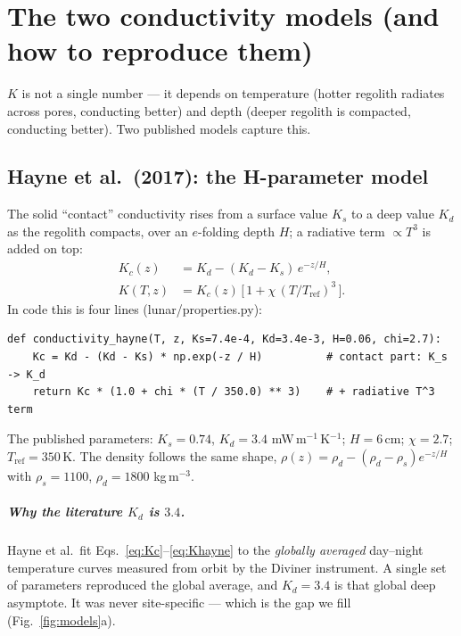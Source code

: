 \documentclass[11pt]{report}
\newcommand{\code}[1]{{\ttfamily\small #1}}
\begin{document}
\chapter{The two conductivity models (and how to reproduce them)}\label{ch:models}
$K$ is not a single number --- it depends on temperature (hotter regolith
radiates across pores, conducting better) and depth (deeper regolith is
compacted, conducting better). Two published models capture this.

\section{Hayne et al.\ (2017): the H-parameter model}\label{sec:hayne}
The solid ``contact'' conductivity rises from a surface value $K_s$ to a deep
value $K_d$ as the regolith compacts, over an $e$-folding depth $H$; a radiative
term $\propto T^3$ is added on top:
\begin{align}
K_c(z) &= K_d - (K_d-K_s)\,e^{-z/H}, \label{eq:Kc}\\
K(T,z) &= K_c(z)\,\bigl[\,1+\chi\,(T/T_{\mathrm{ref}})^3\,\bigr].\label{eq:Khayne}
\end{align}
In code this is four lines (\code{lunar/properties.py}):
\begin{lstlisting}[style=py]
def conductivity_hayne(T, z, Ks=7.4e-4, Kd=3.4e-3, H=0.06, chi=2.7):
    Kc = Kd - (Kd - Ks) * np.exp(-z / H)          # contact part: K_s -> K_d
    return Kc * (1.0 + chi * (T / 350.0) ** 3)    # + radiative T^3 term
\end{lstlisting}
The published parameters: $K_s=0.74$, $K_d=3.4$ mW\,m$^{-1}$\,K$^{-1}$;
$H=6$\,cm; $\chi=2.7$; $T_{\mathrm{ref}}=350$\,K. The density follows the same
shape, $\rho(z)=\rho_d-(\rho_d-\rho_s)e^{-z/H}$ with $\rho_s=1100$,
$\rho_d=1800$ kg\,m$^{-3}$.

\paragraph{Why the literature $K_d$ is $3.4$.} Hayne et al.\ fit
Eqs.~\eqref{eq:Kc}--\eqref{eq:Khayne} to the \emph{globally averaged} day--night
temperature curves measured from orbit by the Diviner instrument. A single set of
parameters reproduced the global average, and $K_d=3.4$ is that global deep
asymptote. It was never site-specific --- which is the gap we fill
(Fig.~\ref{fig:models}a).
\end{document}
